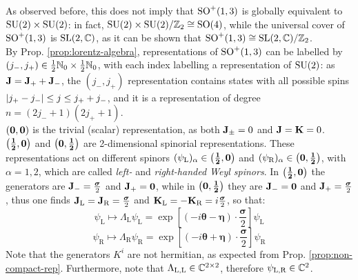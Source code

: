 As observed before, this does not imply that $ \mathrm{SO}^+(1,3) $ is globally equivalent to $ \mathrm{SU}(2) \times \mathrm{SU}(2) $: in fact, $ \mathrm{SU}(2) \times \mathrm{SU}(2) / \mathbb{Z}_2 \cong \mathrm{SO}(4) $, while the universal cover of $ \mathrm{SO}^+(1,3) $ is $ \mathrm{SL}(2,\mathbb{C}) $, as it can be shown that $ \mathrm{SO}^+(1,3) \cong \mathrm{SL}(2,\mathbb{C}) / \mathbb{Z}_2 $.\\
By Prop. \ref{prop:lorentz-algebra}, representations of $ \mathrm{SO}^+(1,3) $ can be labelled by $ (j_-,j_+) \in \frac{1}{2} \mathbb{N}_0 \times \frac{1}{2} \mathbb{N}_0 $, with each index labelling a representation of $ \mathrm{SU}(2) $: as $ \mathbf{J} = \mathbf{J}_+ + \mathbf{J}_- $, the $ (j_-,j_+) $ representation contains states with all possible spins $ \left\lvert j_+ - j_-\right\rvert \le j \le j_+ + j_- $, and it is a representation of degree $ n = \left( 2j_- + 1 \right) \left( 2j_+ + 1 \right) $.\\
$ \mathbf{\left( 0,0 \right)} $ is the trivial (scalar) representation, as both $ \mathbf{J}_{\pm} = 0 $ and $ \mathbf{J} = \mathbf{K} = 0 $.\\
$ \mathbf{\left( \frac{1}{2},0 \right)} $ and $ \mathbf{\left( 0,\frac{1}{2} \right)} $ are 2-dimensional spinorial representations. These representations act on different spinors $ (\psi_\text{L})_\alpha \in \mathbf{\left( \frac{1}{2},0 \right)} $ and $ (\psi_\text{R})_\alpha \in \mathbf{\left( 0,\frac{1}{2} \right)} $, with $ \alpha = 1,2 $, which are called \textit{left-} and \textit{right-handed  Weyl spinors}. In $ \mathbf{\left( \frac{1}{2},0 \right)} $ the generators are $ \mathbf{J}_- = \frac{\boldsymbol{\sigma}}{2} $ and $ \mathbf{J}_+ = \mathbf{0} $, while in $ \mathbf{\left( 0,\frac{1}{2} \right)} $ they are $ \mathbf{J}_- = \mathbf{0} $ and $ \mathbf{J}_+ = \frac{\boldsymbol{\sigma}}{2} $, thus one finds $ \mathbf{J}_\text{L} = \mathbf{J}_\text{R} = \frac{\boldsymbol{\sigma}}{2} $ and $ \mathbf{K}_\text{L} = - \mathbf{K}_\text{R} = i \frac{\boldsymbol{\sigma}}{2} $, so that:
\begin{equation}
  \psi_\text{L} \mapsto \Lambda_\text{L} \psi_\text{L} = \exp \left[ \left( -i \boldsymbol{\theta} - \boldsymbol{\eta} \right) \cdot \frac{\boldsymbol{\sigma}}{2} \right] \psi_\text{L}
  \label{eq:1.40}
\end{equation}
\begin{equation}
  \psi_\text{R} \mapsto \Lambda_\text{R} \psi_\text{R} = \exp \left[ \left( -i \boldsymbol{\theta} + \boldsymbol{\eta} \right) \cdot \frac{\boldsymbol{\sigma}}{2} \right] \psi_\text{R}
  \label{eq:1.41}
\end{equation}
Note that the generators $ K^i $ are not hermitian, as expected from Prop. \ref{prop:non-compact-rep}. Furthermore, note that $ \Lambda_{\text{L},\text{L}} \in \mathbb{C}^{2 \times 2} $, therefore $ \psi_{\text{L},\text{R}} \in \mathbb{C}^2 $.

